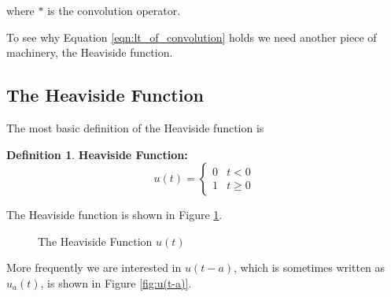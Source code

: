\documentclass{article}
\theoremstyle{definition}
\newtheorem{definition}{Definition}[section]
\begin{document}
\bigskip
\noindent
where $\ast$ is the convolution operator.

\bigskip
\noindent
To see why Equation \ref{eqn:lt_of_convolution} holds we need
another piece of machinery, the Heaviside function. 

\subsection{The Heaviside Function}
The most basic definition of the Heaviside function is

\medskip
\begin{definition} {\bf Heaviside Function:}
\bigskip
\begin{equation*}
u(t) =
 \begin{cases} 
   0 & t < 0  \\
    1 & t \geq 0
   \end{cases}
\end{equation*}
\label{def:heaviside_function}
\end{definition}

\bigskip
\noindent
The Heaviside function is shown in Figure \ref{fig:u(t)}.

\bigskip
\begin{figure}[H]
  \centering
  \caption{The Heaviside Function $u(t)$}
  \label{fig:u(t)}
\end{figure}


\bigskip
\noindent
More frequently we are interested in $u(t-a)$, which is sometimes 
written as $u_a(t)$,  is shown in Figure \ref{fig:u(t-a)}.
\end{document}
